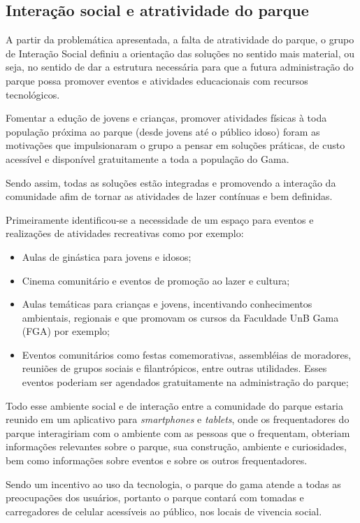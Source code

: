 \subsection{Interação social e atratividade do parque}

	A partir da problemática apresentada, a falta de atratividade do parque, o grupo de Interação Social definiu a orientação das soluções no sentido mais material, ou seja, no sentido de dar a estrutura necessária para que a futura administração do parque possa promover eventos e atividades educacionais com recursos tecnológicos.

	Fomentar a edução de jovens e crianças, promover atividades físicas à toda população próxima ao parque (desde jovens até o público idoso) foram as motivações que impulsionaram o grupo a pensar em soluções práticas, de custo acessível e disponível gratuitamente a toda a população do Gama.

	Sendo assim, todas as soluções estão integradas e promovendo a interação da comunidade afim de tornar as atividades de lazer contínuas e bem definidas.
	
	Primeiramente identificou-se a necessidade de um espaço para eventos e realizações de atividades recreativas como por exemplo:

\begin{itemize}
	\item Aulas de ginástica para jovens e idosos;
	\item Cinema comunitário e eventos de promoção ao lazer e cultura;
	\item Aulas temáticas para crianças e jovens, incentivando conhecimentos ambientais, regionais e que promovam os cursos da Faculdade UnB Gama (FGA) por exemplo;
	\item Eventos comunitários como festas comemorativas, assembléias de moradores, reuniões de grupos sociais e filantrópicos, entre outras utilidades. Esses eventos poderiam ser agendados gratuitamente na administração do parque;
\end{itemize}

	Todo esse ambiente social e de interação entre a comunidade do parque estaria reunido em um aplicativo para \textit{smartphones} e \textit{tablets}, onde os frequentadores do parque interagiriam com o ambiente com as pessoas que o frequentam, obteriam informações relevantes sobre o parque, sua construção, ambiente e curiosidades, bem como informações sobre eventos e sobre os outros frequentadores.

	Sendo um incentivo ao uso da tecnologia, o parque do gama atende a todas as preocupações dos usuários, portanto o parque contará com tomadas e carregadores de celular acessíveis ao público, nos locais de vivencia social.

